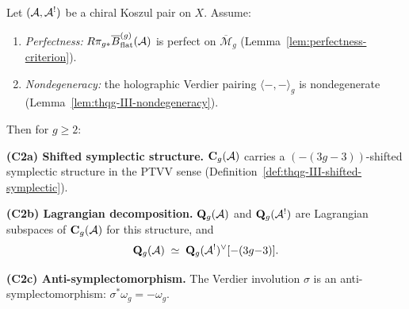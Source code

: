 \begin{theorem}
\label{thm:thqg-III-lagrangian-polarization}
Let $(\mathcal{A}, \mathcal{A}^!)$ be a chiral Koszul pair on $X$.
Assume:
\begin{enumerate}[label=\textup{(H\arabic*)}]
\item \emph{Perfectness:} $R\pi_{g*}\overline{B}^{(g)}_{\mathrm{flat}}(\mathcal{A})$ is
 perfect on $\overline{\mathcal{M}}_g$
 \textup{(}Lemma~\textup{\ref{lem:perfectness-criterion})}.
\item \emph{Nondegeneracy:} the holographic Verdier pairing
 $\langle -, - \rangle_g$ is nondegenerate
 \textup{(}Lemma~\textup{\ref{lem:thqg-III-nondegeneracy})}.
\end{enumerate}
Then for $g \ge 2$:

\smallskip\noindent
\textbf{(C2a) Shifted symplectic structure.}\;
$\mathbf{C}_g(\mathcal{A})$ carries a $(-(3g-3))$-shifted symplectic
structure in the PTVV sense
\textup{(}Definition~\textup{\ref{def:thqg-III-shifted-symplectic})}.

\smallskip\noindent
\textbf{(C2b) Lagrangian decomposition.}\;
$\mathbf{Q}_g(\mathcal{A})$ and $\mathbf{Q}_g(\mathcal{A}^!)$ are Lagrangian
subspaces of $\mathbf{C}_g(\mathcal{A})$ for this structure, and
\begin{equation}\label{eq:thqg-III-lagrangian-decomp}
\mathbf{Q}_g(\mathcal{A})
\;\simeq\;
\mathbf{Q}_g(\mathcal{A}^!)^{\vee}[{-(3g{-}3)}].
\end{equation}

\smallskip\noindent
\textbf{(C2c) Anti-symplectomorphism.}\;
The Verdier involution $\sigma$ is an
anti-symplectomorphism:
$\sigma^* \omega_g = -\omega_g$.
\end{theorem}

